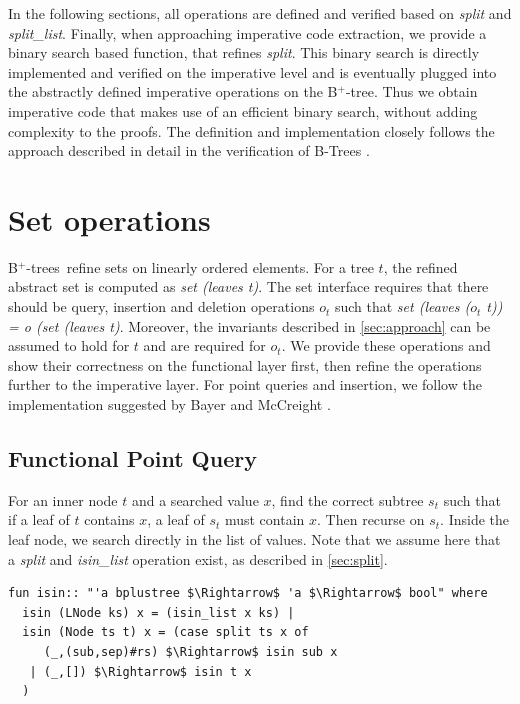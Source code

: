 \documentclass[a4paper,UKenglish,cleveref, cref, thm-restate]{lipics-v2021}
\newcommand{\btree}{B$^+$-tree}
\newcommand{\btrees}{B$^+$-trees}
\begin{document}
In the following sections, all operations are defined and verified
based on \emph{split} and \emph{split\_list}.
Finally, when approaching imperative code extraction,
we provide a binary search based function, that refines \emph{split}.
This binary search is directly implemented and verified on the imperative
level and is eventually plugged into the abstractly defined
imperative operations on the \btree.
Thus we obtain imperative code that makes use of an efficient
binary search, without adding complexity to the proofs.
The definition and implementation closely follows
the approach described in detail in the
verification of B-Trees \cite{DBLP:journals/afp/Mundler21}.


\section{Set operations}
\label{sec:set}

\btrees\ refine sets on linearly ordered elements.
For a tree $t$, the refined abstract set is computed as \emph{set (leaves t)}.
The set interface requires that there should be query, insertion and deletion
operations $o_t$ such that \emph{set (leaves ($o_t$ t)) = o (set (leaves t)}.
Moreover, the invariants described in \cref{sec:approach}
can be assumed to hold for $t$ and are required for $o_t$.
We provide these operations and show their correctness on the functional
layer first, then refine the operations further to the imperative
layer.
For point queries and insertion, we follow the implementation
suggested by Bayer and McCreight \cite{DBLP:journals/acta/BayerM72}.

\subsection{Functional Point Query}
\label{sec:functional_pq}

For an inner node $t$ and a searched value $x$, find the correct subtree $s_t$
such that if a leaf of $t$ contains $x$, a leaf of $s_t$ must contain $x$.
Then recurse on $s_t$.
Inside the leaf node, we search directly in the list of values.
Note that we assume here that a \textit{split} and \textit{isin\_list} operation exist,
as described in \cref{sec:split}.

\begin{lstlisting}[mathescape=true, language=Isabelle,label=lst:isin-def]
fun isin:: "'a bplustree $\Rightarrow$ 'a $\Rightarrow$ bool" where
  isin (LNode ks) x = (isin_list x ks) |
  isin (Node ts t) x = (case split ts x of
     (_,(sub,sep)#rs) $\Rightarrow$ isin sub x
   | (_,[]) $\Rightarrow$ isin t x
  )
\end{lstlisting}
\end{document}
